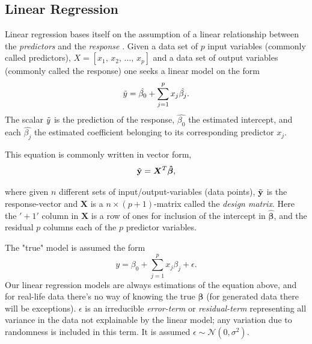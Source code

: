 
\subsection{Linear Regression }\label{Linreg}
Linear regression bases itself on the assumption of a linear relationship between the \textit{predictors} and the \textit{response} \cite[p.21-26]{fahrmeir}. 
Given a data set of $p$ input variables (commonly called predictors), $X=[x_1, \, x_2, \, \ldots, \, x_p]$ and a data set of output variables (commonly called the response) one seeks a linear model on the form
\begin{equation}
\Tilde{y}=\hat{\beta_0}+\sum_{j=1}^{p}x_j\hat{\beta_j}.
\end{equation}
The scalar $\Tilde{y}$ is the prediction of the response, $\hat{\beta_0}$ the estimated intercept, and each $\hat{\beta_j}$ the estimated coefficient belonging to its corresponding predictor $x_j$. 

This equation is commonly written in vector form, 
\begin{equation}
\Tilde{\mathbf{y}}=\boldsymbol{X}^T\boldsymbol{\hat{\beta}},
\end{equation}

where given $n$ different sets of input/output-variables (data points), $\Tilde{\mathbf{y}}$ is the response-vector and $\boldsymbol{X}$ is a $n\times (p+1)$-matrix called the \textit{design matrix}\label{design-matrix}. Here the $'+1'$ column in $\boldsymbol{X}$ is a row of ones for inclusion of the intercept in $\boldsymbol{\hat{\beta}}$, and the residual $p$ columns each of the $p$ predictor variables. 


The "true" model is assumed the form 
\begin{equation}\label{OG_y}
y=\beta_0+\sum_{j=1}^{p}x_j\beta_j+\epsilon.
\end{equation}
Our linear regression models are always estimations of the equation above, and for real-life data there's no way of knowing the true $\boldsymbol{\beta}$ (for generated data there will be exceptions). 
$\epsilon$ is an irreducible \textit{error-term} or \textit{residual-term} representing all variance in the data not explainable by the linear model; any variation due to randomness is included in this term. It is assumed $\epsilon \sim  
\mathcal{N}(0,\sigma^2)$.

